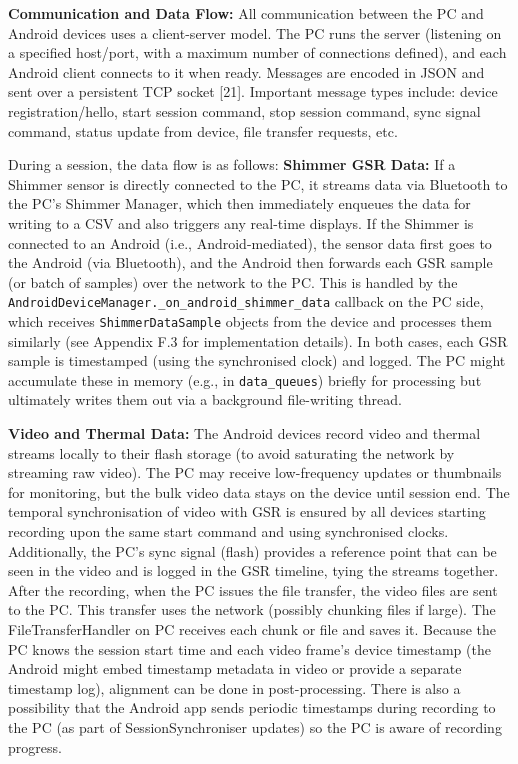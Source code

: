 \textbf{Communication and Data Flow:} All communication between the PC and Android devices uses a client-server model. The PC runs the server (listening on a specified host/port, with a maximum number of connections defined), and each Android client connects to it when ready. Messages are encoded in JSON and sent over a persistent TCP socket [21]. Important message types include: device registration/hello, start session command, stop session command, sync signal command, status update from device, file transfer requests, etc.

During a session, the data flow is as follows: \textbf{Shimmer GSR Data:} If a Shimmer sensor is directly connected to the PC, it streams data via Bluetooth to the PC's Shimmer Manager, which then immediately enqueues the data for writing to a CSV and also triggers any real-time displays. If the Shimmer is connected to an Android (i.e., Android-mediated), the sensor data first goes to the Android (via Bluetooth), and the Android then forwards each GSR sample (or batch of samples) over the network to the PC. This is handled by the \texttt{AndroidDeviceManager.\_on\_android\_shimmer\_data} callback on the PC side, which receives \texttt{ShimmerDataSample} objects from the device and processes them similarly (see Appendix F.3 for implementation details). In both cases, each GSR sample is timestamped (using the synchronised clock) and logged. The PC might accumulate these in memory (e.g., in \texttt{data\_queues}) briefly for processing but ultimately writes them out via a background file-writing thread.

\textbf{Video and Thermal Data:} The Android devices record video and thermal streams locally to their flash storage (to avoid saturating the network by streaming raw video). The PC may receive low-frequency updates or thumbnails for monitoring, but the bulk video data stays on the device until session end. The temporal synchronisation of video with GSR is ensured by all devices starting recording upon the same start command and using synchronised clocks. Additionally, the PC's sync signal (flash) provides a reference point that can be seen in the video and is logged in the GSR timeline, tying the streams together. After the recording, when the PC issues the file transfer, the video files are sent to the PC. This transfer uses the network (possibly chunking files if large). The FileTransferHandler on PC receives each chunk or file and saves it. Because the PC knows the session start time and each video frame's device timestamp (the Android might embed timestamp metadata in video or provide a separate timestamp log), alignment can be done in post-processing. There is also a possibility that the Android app sends periodic timestamps during recording to the PC (as part of SessionSynchroniser updates) so the PC is aware of recording progress.

